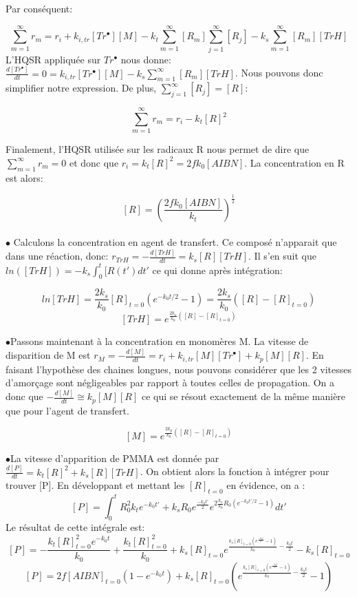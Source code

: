 \documentclass[a4paper,oneside,12pt]{article}
\begin{document}
Par conséquent:

\begin{equation}
\sum\limits_{m=1}^\infty r_{m}=r_i+ k_{i,tr}[Tr^{\bullet}][M] -k_{t}\sum\limits_{m=1}^\infty [R_m] \sum\limits_{j=1}^\infty[R_j]-k_{s}\sum\limits_{m=1}^\infty[R_{m}][TrH]
\end{equation}
L'HQSR appliquée sur $Tr^{\bullet}$ nous donne: $\frac{d[Tr^{\bullet}]}{dt}=0=k_{i,tr}[Tr^{\bullet}][M]-k_{s}\sum\limits_{m=1}^\infty[R_{m}][TrH]$. Nous pouvons donc simplifier notre expression. De plus, $\sum\limits_{j=1}^\infty[R_j] = [R]$:

\begin{equation}
\sum\limits_{m=1}^\infty r_{m}=r_i-k_{t}[R]^2
\end{equation}

Finalement, l'HQSR utilisée sur les radicaux R nous permet de dire que $\sum\limits_{m=1}^\infty r_{m}=0$ et donc que $r_i=k_{t}[R]^2=2fk_{0}[AIBN]$. La concentration en R est alors:

$$[R]=(\frac{2fk_{0}[AIBN]}{k_t})^{\frac{1}{2}}$$\\

$\bullet$ Calculons la concentration en agent de transfert. Ce composé n'apparait que dans une réaction, donc: $r_{TrH}=-\frac{d[TrH]}{dt}=k_s[R][TrH]$. Il s'en suit que $ln([TrH])=-k_s\int_{0}^t [R(t') dt'$ ce qui donne après intégration:

$$ln[TrH]=\frac{2k_{s}}{k_0}[R]_{t=0}(e^{-k_{0}t/2} - 1)=\frac{2k_{s}}{k_0}([R]-[R]_{t=0})$$
$$[TrH]=e^{\frac{2k_{s}}{k_0}([R]-[R]_{t=0})}$$


$\bullet$Passons maintenant à la concentration en monomères M. La vitesse de disparition de M est $r_M = -\frac{d[M]}{dt}=r_{i}+k_{i,tr}[M][Tr^{\bullet}]+k_{p}[M][R]$. En faisant l'hypothèse des chaines longues, nous pouvons considérer que les 2 vitesses d'amorçage sont négligeables par rapport à toutes celles de propagation. On a donc que $-\frac{d[M]}{dt}\cong k_{p}[M][R]$ ce qui se résout exactement de la même manière que pour l'agent de transfert.

$$[M]=e^{\frac{2k_{p}}{k_0}([R]-[R]_{t=0})}$$

$\bullet$La vitesse d'apparition de PMMA est donnée par $\frac{d[P]}{dt}=k_{t}[R]^2+k_{s}[R][TrH]$. On obtient alors la fonction à intégrer pour trouver [P]. En développant et mettant les $[R]_{t=0}$ en évidence, on a :
$$[P]=\int_{0}^t R_{0}^{2}k_te^{-k_0t'}+k_sR_0e^{\frac{-k_0t'}{2}}e^{2\frac{k_s}{k_0}R_0(e^{-k_0t'/2}-1)} dt'$$
Le résultat de cette intégrale est:
$$[P]=-\frac{k_t[R]_{t=0}^2e^{-k_0t}}{k_0}+\frac{k_t[R]_{t=0}^2}{k_0}+k_s[R]_{t=0}e^{\frac{k_s[R]_{t=0}(e^{\frac{-k_0t}{2}}-1)}{k_0}-\frac{k_0t}{2}}-k_s[R]_{t=0}$$
$$[P]=2f[AIBN]_{t=0}(1-e^{-k_0t})+k_s[R]_{t=0}(e^{\frac{k_s[R]_{t=0}(e^{\frac{-k_0t}{2}}-1)}{k_0}-\frac{k_0t}{2}}-1)$$
\end{document}
